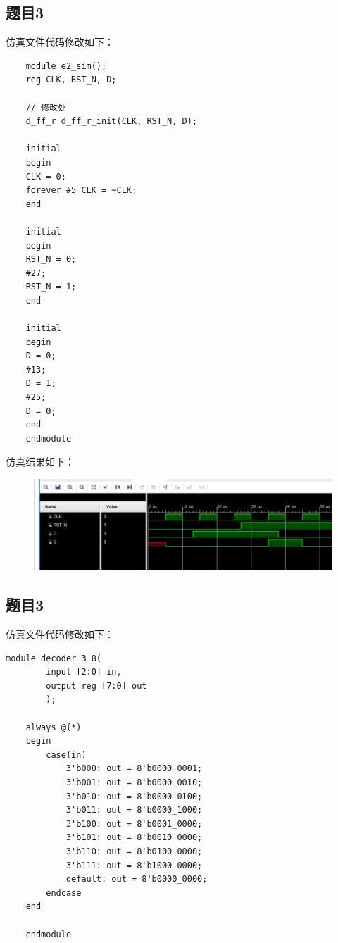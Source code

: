 \documentclass[UTF8]{article}
\begin{document}
	
	\subsection{题目3}
	仿真文件代码修改如下：\par
	\begin{lstlisting}
	module e2_sim();
	reg CLK, RST_N, D;
	
	// 修改处
	d_ff_r d_ff_r_init(CLK, RST_N, D);
	
	initial
	begin
	CLK = 0;
	forever #5 CLK = ~CLK;
	end
	
	initial
	begin
	RST_N = 0;
	#27;
	RST_N = 1;
	end
	
	initial
	begin
	D = 0;
	#13;
	D = 1;
	#25;
	D = 0;
	end
	endmodule
	\end{lstlisting}
	仿真结果如下：\par
	\begin{figure}[H]
	\centering
	\includegraphics[width=1\linewidth]{e3.jpg}
	\label{e3}
	\end{figure}\par
	
	
	\subsection{题目3}
	仿真文件代码修改如下：\par
	\begin{lstlisting}[name=3-8译码器]
	module decoder_3_8(
		input [2:0] in,
		output reg [7:0] out
		);
	
	always @(*)
	begin
		case(in)
			3'b000: out = 8'b0000_0001;
			3'b001: out = 8'b0000_0010;
			3'b010: out = 8'b0000_0100;
			3'b011: out = 8'b0000_1000;
			3'b100: out = 8'b0001_0000;
			3'b101: out = 8'b0010_0000;
			3'b110: out = 8'b0100_0000;
			3'b111: out = 8'b1000_0000;
			default: out = 8'b0000_0000;
		endcase
	end
	
	endmodule
	\end{lstlisting}
	
\end{document}
